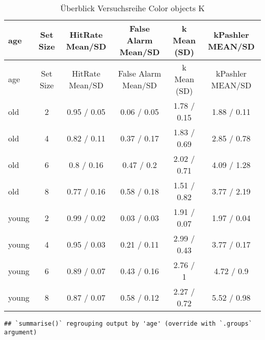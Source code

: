 \documentclass[
]{article}
\newenvironment{Shaded}{\begin{snugshade}}{\end{snugshade}}
\newcommand{\CommentTok}[1]{\textcolor[rgb]{0.56,0.35,0.01}{\textit{#1}}}
\newcommand{\DecValTok}[1]{\textcolor[rgb]{0.00,0.00,0.81}{#1}}
\newcommand{\KeywordTok}[1]{\textcolor[rgb]{0.13,0.29,0.53}{\textbf{#1}}}
\newcommand{\NormalTok}[1]{#1}
\newcommand{\OperatorTok}[1]{\textcolor[rgb]{0.81,0.36,0.00}{\textbf{#1}}}
\newcommand{\StringTok}[1]{\textcolor[rgb]{0.31,0.60,0.02}{#1}}
\begin{document}
\begin{longtable}[]{@{}lccccc@{}}
\caption{Überblick Versuchsreihe Color objects K}\tabularnewline
\toprule
age & Set Size & HitRate Mean/SD & False Alarm Mean/SD & k Mean (SD) &
kPashler MEAN/SD\tabularnewline
\midrule
\endfirsthead
\toprule
age & Set Size & HitRate Mean/SD & False Alarm Mean/SD & k Mean (SD) &
kPashler MEAN/SD\tabularnewline
\midrule
\endhead
old & 2 & 0.95 / 0.05 & 0.06 / 0.05 & 1.78 / 0.15 & 1.88 /
0.11\tabularnewline
old & 4 & 0.82 / 0.11 & 0.37 / 0.17 & 1.83 / 0.69 & 2.85 /
0.78\tabularnewline
old & 6 & 0.8 / 0.16 & 0.47 / 0.2 & 2.02 / 0.71 & 4.09 /
1.28\tabularnewline
old & 8 & 0.77 / 0.16 & 0.58 / 0.18 & 1.51 / 0.82 & 3.77 /
2.19\tabularnewline
young & 2 & 0.99 / 0.02 & 0.03 / 0.03 & 1.91 / 0.07 & 1.97 /
0.04\tabularnewline
young & 4 & 0.95 / 0.03 & 0.21 / 0.11 & 2.99 / 0.43 & 3.77 /
0.17\tabularnewline
young & 6 & 0.89 / 0.07 & 0.43 / 0.16 & 2.76 / 1 & 4.72 /
0.9\tabularnewline
young & 8 & 0.87 / 0.07 & 0.58 / 0.12 & 2.27 / 0.72 & 5.52 /
0.98\tabularnewline
\bottomrule
\end{longtable}

\begin{Shaded}
\end{Shaded}

\begin{verbatim}
## `summarise()` regrouping output by 'age' (override with `.groups` argument)
\end{verbatim}
\end{document}
